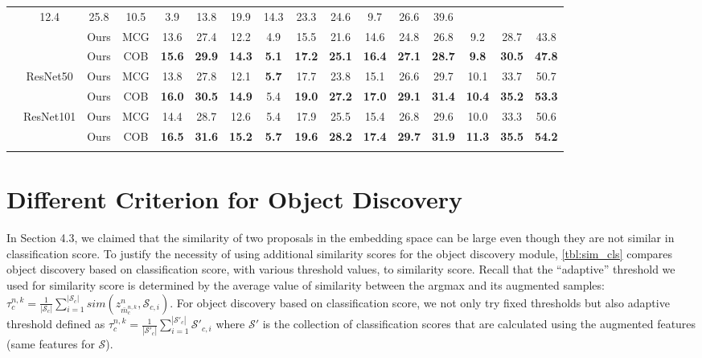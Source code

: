 \documentclass[runningheads]{llncs}
\begin{document}
\begin{table*}[ht!]
{\begin{tabular}{c|c|c|c|c|cc|ccc|ccc|ccc}
 &12.4      &25.8     &10.5        &3.9  &13.8 &19.9 &14.3 &23.3 &24.6 &9.7 &26.6 &39.6 \\
 &                              &Ours  &MCG
 &13.6 &27.4 &12.2 &4.9 &15.5 &21.6 &14.6 &24.8 &26.8 &9.2 &28.7 &43.8 \\
 &         &Ours &COB
 &\textbf{15.6} &\textbf{29.9} &\textbf{14.3} &\textbf{5.1} &\textbf{17.2} &\textbf{25.1} &\textbf{16.4} &\textbf{27.1}
 &\textbf{28.7} &\textbf{9.8} &\textbf{30.5} &\textbf{47.8} \\
\cline{2-16}
 &\multirow{2}{*}{ResNet50}       &Ours &MCG &13.8 &27.8 &12.1 &\textbf{5.7} &17.7 &23.8 &15.1 &26.6 &29.7 &10.1 &33.7 &50.7\\
 &               &Ours &COB 
 &\textbf{16.0} &\textbf{30.5} &\textbf{14.9} &5.4 &\textbf{19.0} &\textbf{27.2} &\textbf{17.0} &\textbf{29.1}
 &\textbf{31.4} &\textbf{10.4} &\textbf{35.2} &\textbf{53.3}\\
\cline{2-16}
 &\multirow{2}{*}{ResNet101}      &Ours &MCG &14.4 &28.7 &12.6 &5.4 &17.9 &25.5 &15.4 &26.8 &29.6 &10.0 &33.3 &50.6\\
 &               &Ours &COB &\textbf{16.5} &\textbf{31.6} &\textbf{15.2} &\textbf{5.7} &\textbf{19.6} &\textbf{28.2} &\textbf{17.4} &\textbf{29.7} &\textbf{31.9} &\textbf{11.3} &\textbf{35.5} &\textbf{54.2}\\
 \Xhline{2\arrayrulewidth}
\end{tabular}}
\label{tbl:proposal_coco}
\end{table*}

\section{Different Criterion for Object Discovery}
\label{sec:performance_cls_sim}
In Section 4.3, we claimed that the similarity of two proposals in the embedding space can be large even though they are not similar in classification score.
To justify the necessity of using additional similarity scores for the object discovery module, \cref{tbl:sim_cls} compares object discovery based on classification score, with various threshold values, to similarity score.
Recall that the ``adaptive'' threshold we used for similarity score is determined by the average value of similarity between the argmax and its augmented samples: $\tau^{n,k}_c = \frac{1}{|\mathcal{S}_c|}\sum^{|\mathcal{S}_c|}_{i=1}{sim(z^{n}_{\bar{m}^{n,k}_c}, \mathcal{S}_{c,i})}$. 
For object discovery based on classification score, we not only try fixed thresholds but also adaptive threshold defined as $\tau^{n,k}_c = \frac{1}{|\mathcal{S'}_c|}\sum^{|\mathcal{S'}_c|}_{i=1}{\mathcal{S'}_{c,i}}$ where $\mathcal{S'}$ is the collection of classification scores that are calculated using the augmented features (same features for    $\mathcal{S}$).
\end{document}
